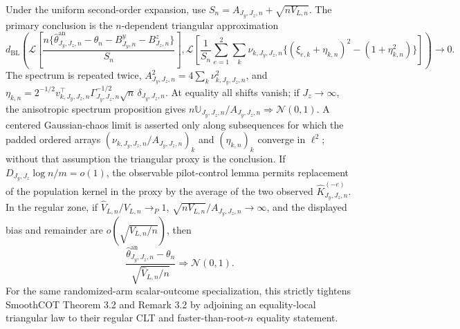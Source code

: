 Under the uniform second-order expansion, use \(S_n=A_{J_y,J_z,n}+\sqrt{nV_{L,n}}\). The primary conclusion is the \(n\)-dependent triangular approximation
\[
d_{\mathrm{BL}}\!\left(\mathcal L\left[\frac{n\{\widehat\theta^{\mathrm{an}}_{J_y,J_z,n}-\theta_n-B^y_{J_y,n}-B^z_{J_z,n}\}}{S_n}\right],\mathcal L\left[\frac{1}{S_n}\sum_{e=1}^2\sum_k\nu_{k,J_y,J_z,n}\{(\xi_{e,k}+\eta_{k,n})^2-(1+\eta_{k,n}^2)\}\right]\right)\to0.
\]
The spectrum is repeated twice, \(A_{J_y,J_z,n}^2=4\sum_k\nu_{k,J_y,J_z,n}^2\), and \(\eta_{k,n}=2^{-1/2}v_{k,J_y,J_z,n}^{\top}\Gamma_{J_y,J_z,n}^{-1/2}\sqrt n\,\delta_{J_y,J_z,n}\). At equality all shifts vanish; if \(J_z\to\infty\), the anisotropic spectrum proposition gives \(n\mathbb U_{J_y,J_z,n}/A_{J_y,J_z,n}\Rightarrow\mathcal N(0,1)\). A centered Gaussian-chaos limit is asserted only along subsequences for which the padded ordered arrays \((\nu_{k,J_y,J_z,n}/A_{J_y,J_z,n})_k\) and \((\eta_{k,n})_k\) converge in \(\ell^2\); without that assumption the triangular proxy is the conclusion. If \(D_{J_y,J_z}\log n/m=o(1)\), the observable pilot-control lemma permits replacement of the population kernel in the proxy by the average of the two observed \(\widehat K_{J_y,J_z,n}^{(-e)}\). In the regular zone, if \(\widehat V_{L,n}/V_{L,n}\to_P1\), \(\sqrt{nV_{L,n}}/A_{J_y,J_z,n}\to\infty\), and the displayed bias and remainder are \(o(\sqrt{V_{L,n}/n})\), then
\[
\frac{\widehat\theta^{\mathrm{an}}_{J_y,J_z,n}-\theta_n}{\sqrt{\widehat V_{L,n}/n}}\Rightarrow\mathcal N(0,1).
\]
For the same randomized-arm scalar-outcome specialization, this strictly tightens SmoothCOT Theorem 3.2 and Remark 3.2 by adjoining an equality-local triangular law to their regular CLT and faster-than-root-\(n\) equality statement.